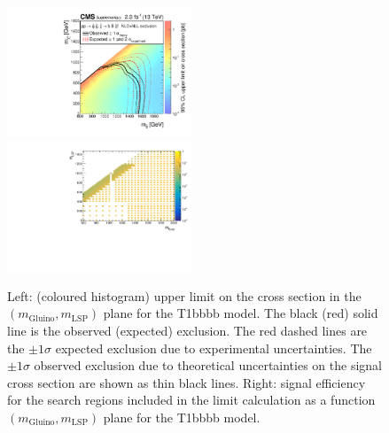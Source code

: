 \clearpage
\begin{figure}[t]
  \begin{center}
    \includegraphics[width=0.49\textwidth]{supplementary/figures/RA1T1bbbbXSEC} \, 
    \includegraphics[width=0.49\textwidth]{supplementary/figures/T1bbbb_merging_4_cats} \,     
  \end{center}
  \caption{Left: (coloured histogram) upper limit on the cross section in the $(m_{\mathrm{Gluino}},m_{\mathrm{LSP}})$ plane for the T1bbbb model. 
  The black (red) solid line is the observed (expected) exclusion. The red dashed lines are the $\pm1\sigma$ expected exclusion due to experimental uncertainties. 
  The $\pm1\sigma$ observed exclusion due to theoretical uncertainties on the signal cross section are shown as thin black lines. 
  Right: signal efficiency for the search regions included in the limit calculation as a function $(m_{\mathrm{Gluino}},m_{\mathrm{LSP}})$ plane for the T1bbbb model. 
  \label{fig:T1bbbb_excl}}
\end{figure}

